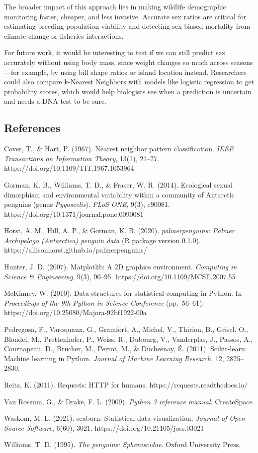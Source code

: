 \documentclass[
  letterpaper,
  DIV=11,
  numbers=noendperiod]{scrartcl}
\begin{document}
The broader impact of this approach lies in making wildlife demographic
monitoring faster, cheaper, and less invasive. Accurate sex ratios are
critical for estimating breeding population viability and detecting
sex-biased mortality from climate change or fisheries interactions.

For future work, it would be interesting to test if we can still predict
sex accurately without using body mass, since weight changes so much
across seasons---for example, by using bill shape ratios or island
location instead. Researchers could also compare k-Nearest Neighbors
with models like logistic regression to get probability scores, which
would help biologists see when a prediction is uncertain and needs a DNA
test to be sure.

\subsection{References}\label{references}

Cover, T., \& Hart, P. (1967). Nearest neighbor pattern classification.
\emph{IEEE Transactions on Information Theory}, 13(1), 21--27.
https://doi.org/10.1109/TIT.1967.1053964

Gorman, K. B., Williams, T. D., \& Fraser, W. R. (2014). Ecological
sexual dimorphism and environmental variability within a community of
Antarctic penguins (genus \emph{Pygoscelis}). \emph{PLoS ONE}, 9(3),
e90081. https://doi.org/10.1371/journal.pone.0090081

Horst, A. M., Hill, A. P., \& Gorman, K. B. (2020).
\emph{palmerpenguins: Palmer Archipelago (Antarctica) penguin data} (R
package version 0.1.0). https://allisonhorst.github.io/palmerpenguins/

Hunter, J. D. (2007). Matplotlib: A 2D graphics environment.
\emph{Computing in Science \& Engineering}, 9(3), 90--95.
https://doi.org/10.1109/MCSE.2007.55

McKinney, W. (2010). Data structures for statistical computing in
Python. In \emph{Proceedings of the 9th Python in Science Conference}
(pp.~56--61). https://doi.org/10.25080/Majora-92bf1922-00a

Pedregosa, F., Varoquaux, G., Gramfort, A., Michel, V., Thirion, B.,
Grisel, O., Blondel, M., Prettenhofer, P., Weiss, R., Dubourg, V.,
Vanderplas, J., Passos, A., Cournapeau, D., Brucher, M., Perrot, M., \&
Duchesnay, É. (2011). Scikit-learn: Machine learning in Python.
\emph{Journal of Machine Learning Research}, 12, 2825--2830.

Reitz, K. (2011). Requests: HTTP for humans.
https://requests.readthedocs.io/

Van Rossum, G., \& Drake, F. L. (2009). \emph{Python 3 reference
manual}. CreateSpace.

Waskom, M. L. (2021). seaborn: Statistical data visualization.
\emph{Journal of Open Source Software}, 6(60), 3021.
https://doi.org/10.21105/joss.03021

Williams, T. D. (1995). \emph{The penguins: Spheniscidae}. Oxford
University Press.
\end{document}
